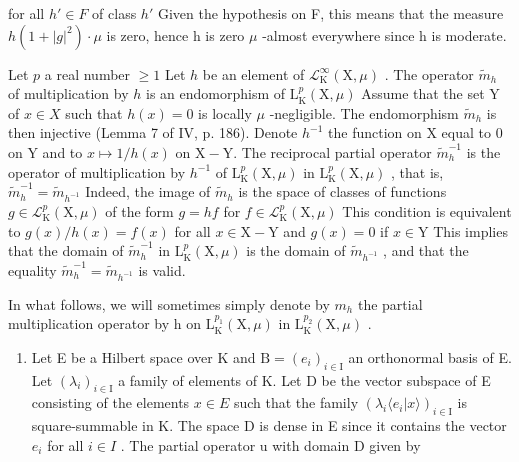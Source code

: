 for all \(h' \in F\) of class \(h'\) Given the hypothesis on F, this means that the measure \(h(1 + |g|^{2}) \cdot \mu\) is zero, hence h is zero \(\mu\) -almost everywhere since h is moderate.

Let \(p\) a real number \(\geqslant 1\) Let \(h\) be an element of \(\mathcal{L}_{\mathrm{K}}^{\infty}(\mathrm{X},\mu)\) . The operator \(\widetilde{m}_h\) of multiplication by \(h\) is an endomorphism of \(\mathrm{L}_{\mathrm{K}}^{p}(\mathrm{X},\mu)\) Assume that the set Y of \(x\in X\) such that \(h(x)=0\) is locally \(\mu\) -negligible. The endomorphism \(\widetilde{m}_h\) is then injective (Lemma 7 of IV, p. 186). Denote \(h^{-1}\) the function on X equal to 0 on Y and to \(x \mapsto 1/h(x)\) on \(\mathrm{X} - \mathrm{Y}\). The reciprocal partial operator \(\widetilde{m}_{h}^{-1}\) is the operator of multiplication by \(h^{-1}\) of \(\mathrm{L}_{\mathrm{K}}^{p}(\mathrm{X},\mu)\) in \(\mathrm{L}_{\mathrm{K}}^{p}(\mathrm{X},\mu)\) , that is, \(\widetilde{m}_{h}^{-1} = \widetilde{m}_{h^{-1}}\) Indeed, the image of \(\widetilde{m}_{h}\) is the space of classes of functions \(g \in \mathcal{L}_{\mathrm{K}}^{p}(\mathrm{X},\mu)\) of the form \(g = hf\) for \(f \in \mathcal{L}_{\mathrm{K}}^{p}(\mathrm{X},\mu)\) This condition is equivalent to \(g(x)/h(x) = f(x)\) for all \(x \in \mathrm{X} - \mathrm{Y}\) and \(g(x) = 0\) if \(x \in \mathrm{Y}\) This implies that the domain of \(\widetilde{m}_{h}^{-1}\) in \(\mathrm{L}_{\mathrm{K}}^{p}(\mathrm{X},\mu)\) is the domain of \(\widetilde{m}_{h^{-1}}\) , and that the equality \(\widetilde{m}_{h}^{-1} = \widetilde{m}_{h^{-1}}\) is valid.

In what follows, we will sometimes simply denote by \(m_{h}\) the partial multiplication operator by h on \(\mathrm{L}_{\mathrm{K}}^{p_{1}}(\mathrm{X},\mu)\) in \(\mathrm{L}_{\mathrm{K}}^{p_{2}}(\mathrm{X},\mu)\) .

\begin{enumerate}
\def\labelenumi{\arabic{enumi})}
\setcounter{enumi}{1}
\tightlist
\item
  Let E be a Hilbert space over K and \(\mathrm{B} = (e_i)_{i \in \mathrm{I}}\) an orthonormal basis of E. Let \((\lambda_i)_{i \in \mathrm{I}}\) a family of elements of K. Let D be the vector subspace of E consisting of the elements \(x \in E\) such that the family \((\lambda_i \langle e_i | x \rangle)_{i \in \mathrm{I}}\) is square-summable in K. The space D is dense in E since it contains the vector \(e_i\) for all \(i \in I\) . The partial operator u with domain D given by
\end{enumerate}


